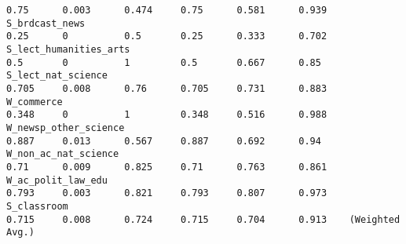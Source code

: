 {\begin{verbatim}
0.75      0.003      0.474     0.75      0.581      0.939    S_brdcast_news
0.25      0          0.5       0.25      0.333      0.702    S_lect_humanities_arts
0.5       0          1         0.5       0.667      0.85     S_lect_nat_science
0.705     0.008      0.76      0.705     0.731      0.883    W_commerce
0.348     0          1         0.348     0.516      0.988    W_newsp_other_science
0.887     0.013      0.567     0.887     0.692      0.94     W_non_ac_nat_science
0.71      0.009      0.825     0.71      0.763      0.861    W_ac_polit_law_edu
0.793     0.003      0.821     0.793     0.807      0.973    S_classroom
0.715     0.008      0.724     0.715     0.704      0.913    (Weighted Avg.)
\end{verbatim}
}
